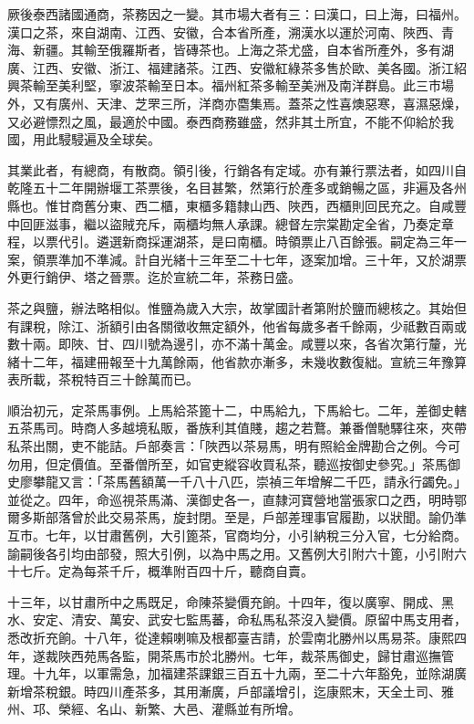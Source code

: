 \begin{pinyinscope}
厥後泰西諸國通商，茶務因之一變。其市場大者有三：曰漢口，曰上海，曰福州。漢口之茶，來自湖南、江西、安徽，合本省所產，溯漢水以運於河南、陜西、青海、新疆。其輸至俄羅斯者，皆磚茶也。上海之茶尤盛，自本省所產外，多有湖廣、江西、安徽、浙江、福建諸茶。江西、安徽紅綠茶多售於歐、美各國。浙江紹興茶輸至美利堅，寧波茶輸至日本。福州紅茶多輸至美洲及南洋群島。此三市場外，又有廣州、天津、芝罘三所，洋商亦麕集焉。蓋茶之性喜燠惡寒，喜濕惡燥，又必避慓烈之風，最適於中國。泰西商務雖盛，然非其土所宜，不能不仰給於我國，用此駸駸遍及全球矣。

其業此者，有總商，有散商。領引後，行銷各有定域。亦有兼行票法者，如四川自乾隆五十二年開辦堰工茶票後，名目甚繁，然第行於產多或銷暢之區，非遍及各州縣也。惟甘商舊分東、西二櫃，東櫃多籍隸山西、陜西，西櫃則回民充之。自咸豐中回匪滋事，繼以盜賊充斥，兩櫃均無人承課。總督左宗棠勘定全省，乃奏定章程，以票代引。遴選新商採運湖茶，是曰南櫃。時領票止八百餘張。嗣定為三年一案，領票準加不準減。計自光緒十三年至二十七年，逐案加增。三十年，又於湖票外更行銷伊、塔之晉票。迄於宣統二年，茶務日盛。

茶之與鹽，辦法略相似。惟鹽為歲入大宗，故掌國計者第附於鹽而總核之。其始但有課稅，除江、浙額引由各關徵收無定額外，他省每歲多者千餘兩，少祗數百兩或數十兩。即陜、甘、四川號為邊引，亦不滿十萬金。咸豐以來，各省次第行釐，光緒十二年，福建冊報至十九萬餘兩，他省款亦漸多，未幾收數復絀。宣統三年豫算表所載，茶稅特百三十餘萬而已。

順治初元，定茶馬事例。上馬給茶篦十二，中馬給九，下馬給七。二年，差御史轄五茶馬司。時商人多越境私販，番族利其值賤，趨之若鶩。兼番僧馳驛往來，夾帶私茶出關，吏不能詰。戶部奏言：「陜西以茶易馬，明有照給金牌勘合之例。今可勿用，但定價值。至番僧所至，如官吏縱容收買私茶，聽巡按御史參究。」茶馬御史廖攀龍又言：「茶馬舊額萬一千八十八匹，崇禎三年增解二千匹，請永行蠲免。」並從之。四年，命巡視茶馬滿、漢御史各一，直隸河寶營地當張家口之西，明時鄂爾多斯部落曾於此交易茶馬，旋封閉。至是，戶部差理事官履勘，以狀聞。諭仍準互市。七年，以甘肅舊例，大引篦茶，官商均分，小引納稅三分入官，七分給商。諭嗣後各引均由部發，照大引例，以為中馬之用。又舊例大引附六十篦，小引附六十七斤。定為每茶千斤，概準附百四十斤，聽商自賣。

十三年，以甘肅所中之馬既足，命陳茶變價充餉。十四年，復以廣寧、開成、黑水、安定、清安、萬安、武安七監馬蕃，命私馬私茶沒入變價。原留中馬支用者，悉改折充餉。十八年，從達賴喇嘛及根都臺吉請，於雲南北勝州以馬易茶。康熙四年，遂裁陜西苑馬各監，開茶馬市於北勝州。七年，裁茶馬御史，歸甘肅巡撫管理。十九年，以軍需急，加福建茶課銀三百五十九兩，至二十六年豁免，並除湖廣新增茶稅銀。時四川產茶多，其用漸廣，戶部議增引，迄康熙末，天全土司、雅州、邛、榮經、名山、新繁、大邑、灌縣並有所增。


\end{pinyinscope}
